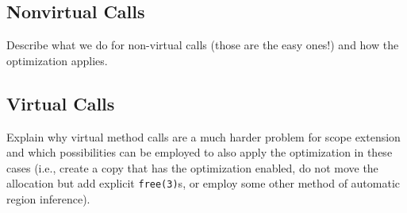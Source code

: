 		\subsection{Nonvirtual Calls}
			\label{sub:scopeext:analysis:nonvirtual}
			Describe what we do for non-virtual calls (those are the easy ones!) and how the optimization applies.

		\subsection{Virtual Calls}
			\label{sub:scopeext:analysis:virtual}
			Explain why virtual method calls are a much harder problem for scope extension and which possibilities can be
			employed to also apply the optimization in these cases (i.e., create a copy that has the optimization enabled, do
			not move the allocation but add explicit \texttt{free(3)}s, or employ some other method of automatic region
			inference).

